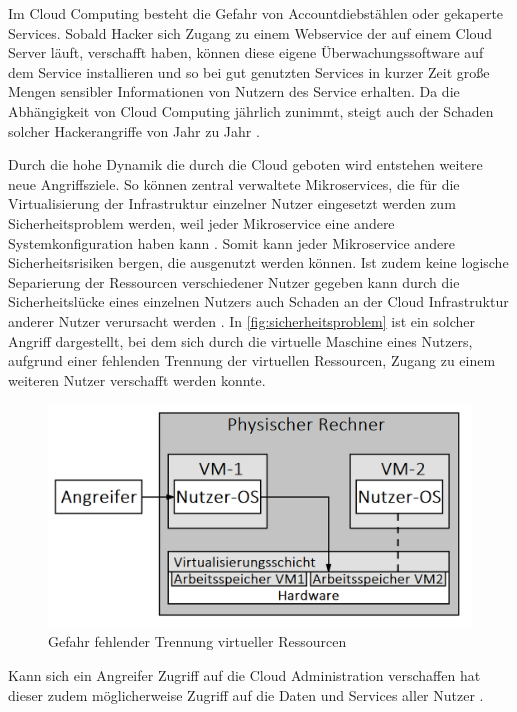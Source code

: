 Im Cloud Computing besteht die Gefahr von Accountdiebstählen oder gekaperte Services. 
Sobald Hacker sich Zugang zu einem Webservice der auf einem Cloud Server läuft, verschafft haben, 
können diese eigene Überwachungssoftware auf dem Service installieren 
und so bei gut genutzten Services in kurzer Zeit große Mengen sensibler Informationen von Nutzern des Service erhalten.
Da die Abhängigkeit von Cloud Computing jährlich zunimmt, 
steigt auch der Schaden solcher Hackerangriffe von Jahr zu Jahr \cite{jabbar2020}. 
 
Durch die hohe Dynamik die durch die Cloud geboten wird entstehen weitere neue Angriffsziele. So können zentral verwaltete Mikroservices, die für die Virtualisierung der Infrastruktur einzelner Nutzer eingesetzt werden zum Sicherheitsproblem werden, weil jeder Mikroservice eine andere Systemkonfiguration haben kann \cite{chen2019}. Somit kann jeder Mikroservice andere Sicherheitsrisiken bergen, die ausgenutzt werden können. Ist zudem keine logische Separierung der Ressourcen verschiedener Nutzer gegeben kann durch die Sicherheitslücke eines einzelnen Nutzers auch Schaden an der Cloud Infrastruktur anderer Nutzer verursacht werden \cite{wehrhahn-aklender2019}. In \autoref{fig:sicherheitsproblem} ist ein solcher Angriff dargestellt, bei dem sich durch die virtuelle Maschine eines Nutzers, aufgrund einer fehlenden Trennung der virtuellen Ressourcen, Zugang zu einem weiteren Nutzer verschafft werden konnte. 

\begin{figure}[b]
	\centering
	\includegraphics[width=\linewidth]{images/sicherheitsproblemneu.png}	
	\caption{Gefahr fehlender Trennung virtueller Ressourcen \cite{wehrhahn-aklender2019}}
	\label{fig:sicherheitsproblem}
\end{figure}

 Kann sich ein Angreifer Zugriff auf die Cloud Administration verschaffen hat dieser zudem möglicherweise Zugriff auf die Daten und Services aller Nutzer \cite{wehrhahn-aklender2019}.

